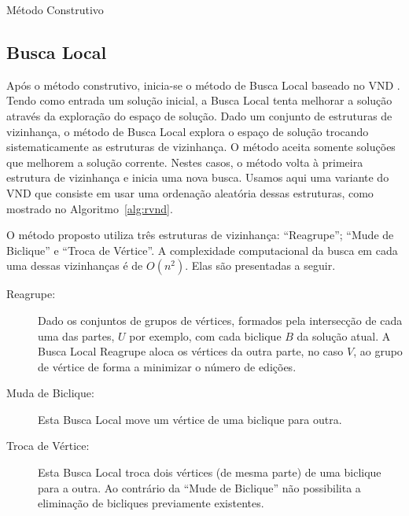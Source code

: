 \documentclass[article]{rian_article}
\begin{document}
\begin{algorithm}[hbtp]
\caption{Método Construtivo}
\label{alg:const}
\begin{algorithmic}[1]
\footnotesize
{}
    
    
    
  \EndFor
   
  \If{$\tilde{\mu} < \mu^{\ast} $}
  \EndIf
 \EndWhile
\EndProcedure
\end{algorithmic}
\end{algorithm}

\subsection{Busca Local} \label{sec::buscalocal}
Após o método construtivo, inicia-se o método de Busca Local baseado no VND \citep{martello2002}.
Tendo como entrada um solução inicial, a Busca Local tenta melhorar a solução através da exploração do espaço de solução.
Dado um conjunto de estruturas de vizinhança, o método de Busca Local explora o espaço de solução trocando sistematicamente as estruturas de vizinhança.
O método aceita somente soluções que melhorem a solução corrente.
Nestes casos, o método volta à primeira estrutura de vizinhança e inicia uma nova busca.
Usamos aqui uma variante do VND que consiste em usar uma ordenação aleatória dessas estruturas, como mostrado no Algoritmo~\ref{alg:rvnd}.

O método proposto utiliza três estruturas de vizinhança: ``Reagrupe''; ``Mude de Biclique'' e ``Troca de Vértice''.
A complexidade computacional da busca em cada uma dessas vizinhanças é de $O(n^2)$.
Elas são presentadas a seguir.

\begin{description}
 \item [Reagrupe:]
Dado os conjuntos de grupos de vértices, formados pela intersecção de cada uma das partes, $U$ por exemplo, com cada biclique $B$ da solução atual.
A Busca Local Reagrupe aloca os vértices da outra parte, no caso $V$, ao grupo de vértice de forma a minimizar o número de edições.
 
 \item [Muda de Biclique:]
Esta Busca Local move um vértice de uma biclique para outra.
 
 \item[Troca de Vértice:]
Esta Busca Local troca dois vértices (de mesma parte) de uma biclique para a outra. Ao contrário da ``Mude de Biclique'' não possibilita a eliminação de bicliques previamente existentes.
\end{description}
\end{document}
